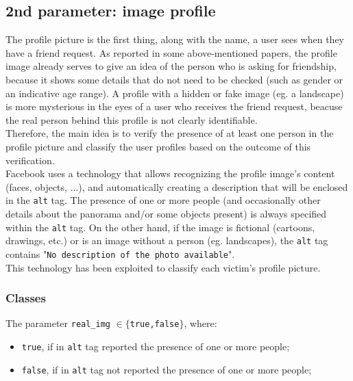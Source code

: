 \subsection{2nd parameter: image profile}
The profile picture is the first thing, along with the name, a user sees when they have a friend request. As reported in some above-mentioned papers, the profile image already serves to give an idea of the person who is asking for friendship, because it shows some details that do not need to be checked (such as gender or an indicative age range).
A profile with a hidden or fake image (eg. a landscape) is more mysterious in the eyes of a user who receives the friend request, beacuse the real person behind this profile is not clearly identifiable.\\
Therefore, the main idea is to verify the presence of at least one person in the profile picture and classify the user profiles based on the outcome of this verification.\\
Facebook uses a technology that allows recognizing the profile image's content (faces, objects, ...), and automatically creating a description that will be enclosed in the \texttt{alt} tag. 
The presence of one or more people (and occasionally other details about the panorama and/or some objects present) is always specified within the \texttt{alt} tag. On the other hand, if the image is fictional (cartoons, drawings, etc.) or is an image without a person (eg. landscapes), the \texttt{alt} tag contains "\texttt{No description of the photo available}".\\
This technology has been exploited to classify each victim's profile picture.
\subsubsection*{Classes}
The parameter \texttt{real\_img} $ \in \{$\texttt{true,false}$\}$, where: 
\begin{itemize}
	\item \texttt{true}, if in \texttt{alt} tag reported the presence of one or more people;
	\item \texttt{false}, if in \texttt{alt} tag not reported the presence of one or more people;
\end{itemize}
